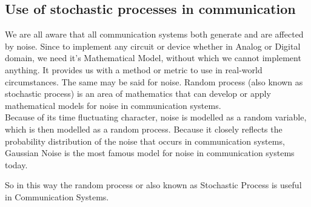 \documentclass[10pt,twocolumn,letterpaper]{article}
\begin{document}
\subsection{Use of stochastic processes in communication}

We are all aware that all communication systems both generate and are affected by noise. Since to implement any circuit or device whether in Analog or Digital domain, we need it’s Mathematical Model, without which we cannot implement anything. It provides us with a method or metric to use in real-world circumstances. The same may be said for noise. Random process (also known as stochastic process) is an area of mathematics that can develop or apply mathematical models for noise in communication systems.\\

Because of its time fluctuating character, noise is modelled as a random variable, which is then modelled as a random process. Because it closely reflects the probability distribution of the noise that occurs in communication systems, Gaussian Noise is the most famous model for noise in communication systems today.

So in this way the random process or also known as Stochastic Process is useful in Communication Systems.
\end{document}
